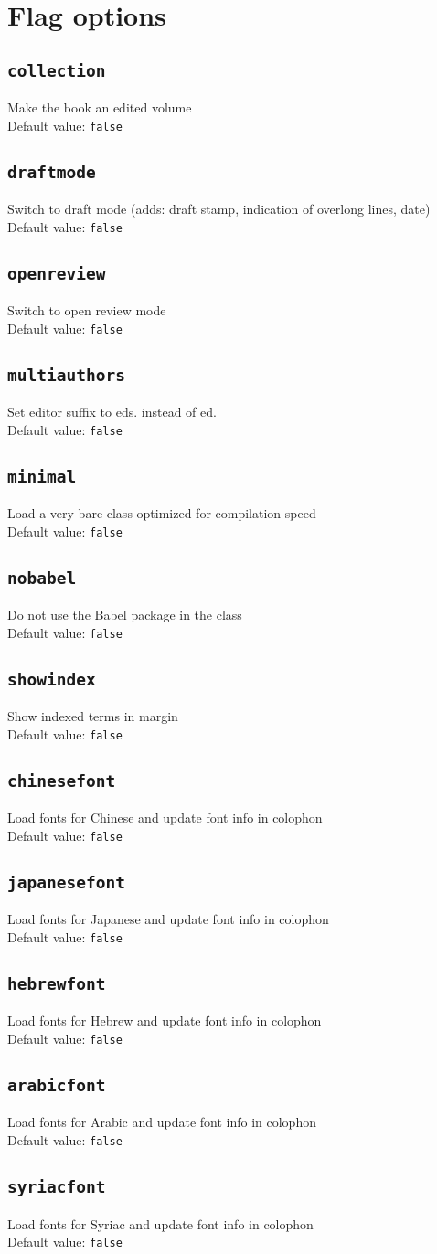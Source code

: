 \documentclass[%
output=guidelines,guidelines]{langscibook}
\newcommand{\option}[3]{\subsection{\texttt{#1}}{#2}\\Default value: {\texttt{#3}}}
\begin{document}
\section{Flag options}
\option{collection}{Make the book an edited volume}{false}
\option{draftmode}{Switch to draft mode (adds: draft stamp, indication of overlong lines, date)}{false}
\option{openreview}{Switch to open review mode}{false}
\option{multiauthors}{Set editor suffix to eds. instead of ed.}{false}
\option{minimal}{Load a very bare class optimized for compilation speed}{false}
\option{nobabel}{Do not use the Babel package in the class}{false}
\option{showindex}{Show indexed terms in margin}{false}
\option{chinesefont}{Load fonts for Chinese and update font info in colophon}{false}
\option{japanesefont}{Load fonts for Japanese and update font info in colophon}{false}
\option{hebrewfont}{Load fonts for Hebrew and update font info in colophon}{false}
\option{arabicfont}{Load fonts for Arabic and update font info in colophon}{false}
\option{syriacfont}{Load fonts for Syriac and update font info in colophon}{false}
\end{document}
